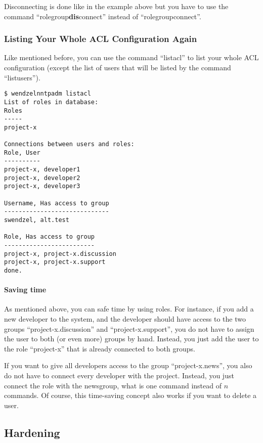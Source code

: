 \documentclass[12pt,fleqn,leqno]{scrbook}
\begin{document}
Disconnecting is done like in the example above but you have to use the
command ``rolegroup\textbf{dis}connect'' instead of
``rolegroupconnect''.

\hypertarget{listing-your-whole-acl-configuration-again}{%
\subsubsection{Listing Your Whole ACL Configuration
Again}\label{listing-your-whole-acl-configuration-again}}

Like mentioned before, you can use the command ``listacl'' to list your
whole ACL configuration (except the list of users that will be listed by
the command ``listusers'').

\begin{verbatim}
$ wendzelnntpadm listacl
List of roles in database:
Roles
-----
project-x

Connections between users and roles:
Role, User
----------
project-x, developer1
project-x, developer2
project-x, developer3

Username, Has access to group
-----------------------------
swendzel, alt.test

Role, Has access to group
-------------------------
project-x, project-x.discussion
project-x, project-x.support
done.
\end{verbatim}

\hypertarget{saving-time}{%
\paragraph{Saving time}\label{saving-time}}

As mentioned above, you can safe time by using roles. For instance, if
you add a new developer to the system, and the developer should have
access to the two groups ``project-x.discussion'' and
``project-x.support'', you do not have to assign the user to both (or
even more) groups by hand. Instead, you just add the user to the role
``project-x'' that is already connected to both groups.

If you want to give all developers access to the group
``project-x.news'', you also do not have to connect every developer with
the project. Instead, you just connect the role with the newsgroup, what
is one command instead of \(n\) commands. Of course, this time-saving
concept also works if you want to delete a user.

\hypertarget{hardening}{%
\subsection{Hardening}\label{hardening}}
\end{document}
